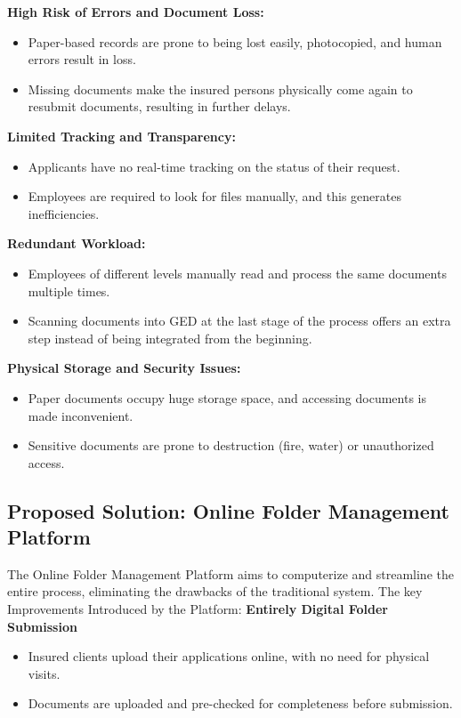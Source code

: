 \textbf{ High Risk of Errors and Document Loss:}
\begin{itemize}
    \item Paper-based records are prone to being lost easily, photocopied, and human errors result in loss.
    \item Missing documents make the insured persons physically come again to resubmit documents, resulting in further delays.
\end{itemize}

\textbf{ Limited Tracking and Transparency:}
\begin{itemize}
    \item Applicants have no real-time tracking on the status of their request.
    \item Employees are required to look for files manually, and this generates inefficiencies.
\end{itemize}

\textbf{ Redundant Workload:}
\begin{itemize}
    \item Employees of different levels manually read and process the same documents multiple times.
    \item Scanning documents into GED at the last stage of the process offers an extra step instead of being integrated from the beginning.
\end{itemize}

\textbf{ Physical Storage and Security Issues:}
\begin{itemize}
    \item Paper documents occupy huge storage space, and accessing documents is made inconvenient.
    \item Sensitive documents are prone to destruction (fire, water) or unauthorized access.
\end{itemize}

\subsection{Proposed Solution: Online Folder Management Platform}
The Online Folder Management Platform aims to computerize and streamline the entire process, eliminating the drawbacks of the traditional system. The key Improvements Introduced by the Platform:
\textbf{ Entirely Digital Folder Submission}
\begin{itemize}
    \item Insured clients upload their applications online, with no need for physical visits.
    \item Documents are uploaded and pre-checked for completeness before submission.
\end{itemize}

